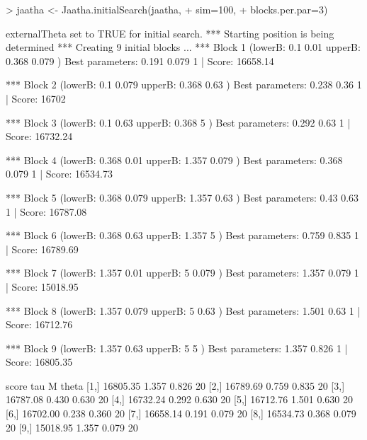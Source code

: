 
\begin{Schunk}
\begin{Sinput}
> jaatha <- Jaatha.initialSearch(jaatha, 
+                                sim=100, 
+                                blocks.per.par=3)
\end{Sinput}
\begin{Soutput}
externalTheta set to TRUE for initial search. 
*** Starting position is being determined *** 
Creating 9 initial blocks ...  
*** Block 1  (lowerB: 0.1 0.01  upperB: 0.368 0.079 ) 
Best parameters:  0.191 0.079 1 | Score: 16658.14 

*** Block 2  (lowerB: 0.1 0.079  upperB: 0.368 0.63 ) 
Best parameters:  0.238 0.36 1 | Score: 16702 

*** Block 3  (lowerB: 0.1 0.63  upperB: 0.368 5 ) 
Best parameters:  0.292 0.63 1 | Score: 16732.24 

*** Block 4  (lowerB: 0.368 0.01  upperB: 1.357 0.079 ) 
Best parameters:  0.368 0.079 1 | Score: 16534.73 

*** Block 5  (lowerB: 0.368 0.079  upperB: 1.357 0.63 ) 
Best parameters:  0.43 0.63 1 | Score: 16787.08 

*** Block 6  (lowerB: 0.368 0.63  upperB: 1.357 5 ) 
Best parameters:  0.759 0.835 1 | Score: 16789.69 

*** Block 7  (lowerB: 1.357 0.01  upperB: 5 0.079 ) 
Best parameters:  1.357 0.079 1 | Score: 15018.95 

*** Block 8  (lowerB: 1.357 0.079  upperB: 5 0.63 ) 
Best parameters:  1.501 0.63 1 | Score: 16712.76 

*** Block 9  (lowerB: 1.357 0.63  upperB: 5 5 ) 
Best parameters:  1.357 0.826 1 | Score: 16805.35 

         score   tau     M theta
 [1,] 16805.35 1.357 0.826    20
 [2,] 16789.69 0.759 0.835    20
 [3,] 16787.08 0.430 0.630    20
 [4,] 16732.24 0.292 0.630    20
 [5,] 16712.76 1.501 0.630    20
 [6,] 16702.00 0.238 0.360    20
 [7,] 16658.14 0.191 0.079    20
 [8,] 16534.73 0.368 0.079    20
 [9,] 15018.95 1.357 0.079    20
\end{Soutput}
\end{Schunk}

